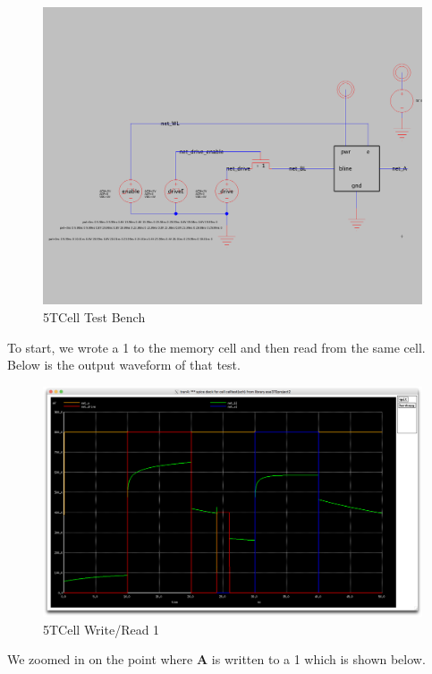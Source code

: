 \documentclass[a4paper]{article}
\begin{document}
\begin{figure}[H]
	\centering
	\includegraphics[scale=0.2]{5TCellTest}
	\caption{5TCell Test Bench}
	\label{fig:5TCellTest}
\end{figure}

 To start, we wrote a 1 to the memory cell and then read from the same cell. Below is the output waveform of that test.\\
 
 \begin{figure}[H]
	\centering
	\includegraphics[scale=0.12]{5TWR1}
	\caption{5TCell Write/Read 1}
	\label{fig:5TWR1}
\end{figure}
We zoomed in on the point where \textbf{A} is written to a 1 which is shown below.\\
\end{document}
